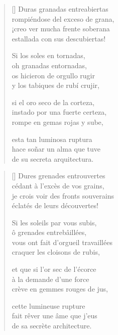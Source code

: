 



\settowidth{\versewidth}{Cediendo al exceso de las granas,}

\bigskip

\begin{verse}[\versewidth]
  Duras granadas entreabiertas \\
  rompiéndose del exceso de grana, \\
  ¡creo ver mucha frente soberana \\
  estallada con sus descubiertas!

  Si los soles en tornadas, \\
  oh granadas entornadas, \\
  os hicieron de orgullo rugir \\
  y los tabiques de rubí crujir,

  si el oro seco de la corteza, \\
  instado por una fuerte certeza, \\
  rompe en gemas rojas y sube,

  esta tan luminosa ruptura \\
  hace soñar un alma que tuve \\
  de su secreta arquitectura.
\end{verse}

\newpage



\settowidth{\versewidth}{Vous ont fait d'orgueil travaillées}

\bigskip

{\itshape
\begin{verse}[\versewidth]
  Dures grenades entrouvertes \\
  cédant à l'excès de vos grains, \\
  je crois voir des fronts souverains \\
  éclatés de leurs découvertes!

  Si les soleils par vous subis, \\
  ô grenades entrebâillées, \\
  vous ont fait d'orgueil travaillées \\
  craquer les cloisons de rubis,

  et que si l'or sec de l'écorce \\
  à la demande d'une force \\
  crève en gemmes rouges de jus,

  cette lumineuse rupture \\
  fait rêver une âme que j'eus \\
  de sa secrète architecture.
\end{verse}
}
